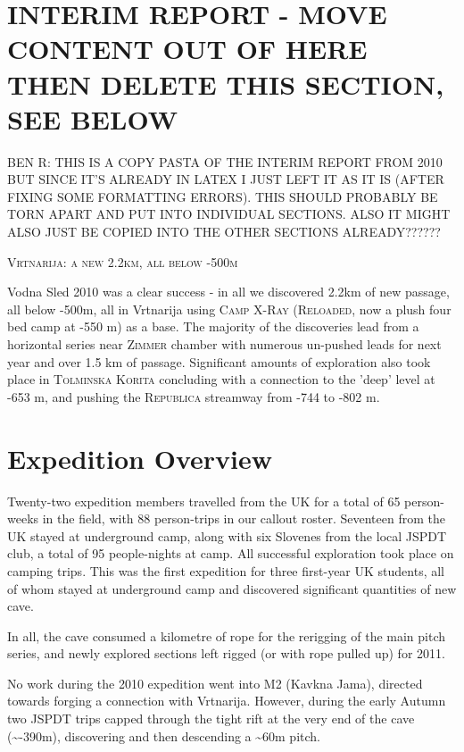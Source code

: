 \section{INTERIM REPORT - MOVE CONTENT OUT OF HERE THEN DELETE THIS SECTION, SEE BELOW}


\author{James Kirkpatrick, Jana \v{C}arga, Gergely Ambrus and Jarvist Moore
Frost}

BEN R: THIS IS A COPY PASTA OF THE INTERIM REPORT FROM 2010 BUT SINCE IT'S ALREADY IN LATEX I JUST LEFT IT AS IT IS (AFTER FIXING SOME FORMATTING ERRORS). THIS SHOULD PROBABLY BE TORN APART AND PUT INTO INDIVIDUAL SECTIONS. ALSO IT MIGHT ALSO JUST BE COPIED INTO THE OTHER SECTIONS ALREADY??????


\textsc{Vrtnarija: a new 2.2km, all below -500m}

Vodna Sled 2010 was a clear success - in all we discovered 2.2km of
new passage, all below -500m, all in Vrtnarija using \textsc{Camp
X-Ray} (\textsc{Reloaded}, now a plush four bed camp at -550 m) as a base.
The majority of the discoveries lead from a horizontal series near
\textsc{Zimmer} chamber with numerous un-pushed leads for next year
and over 1.5 km of passage. Significant amounts of exploration also
took place in \textsc{Tolminska Korita} concluding with a connection
to the 'deep' level at -653 m, and pushing the \textsc{Republica}
streamway from -744 to -802 m.

\tableofcontents

\section{Expedition Overview}

Twenty-two expedition members travelled from the UK for a total of
65 person-weeks in the field, with 88 person-trips in our callout
roster. Seventeen from the UK stayed at underground camp, along with
six Slovenes from the local JSPDT club, a total of 95 people-nights
at camp. All successful exploration took place on camping trips. 
This was the first expedition for three
first-year UK students, all of whom stayed at underground camp and
discovered significant quantities of new cave.

In all, the cave consumed a kilometre of rope for the rerigging of
the main pitch series, and newly explored sections left rigged (or
with rope pulled up) for 2011.

No work during the 2010 expedition went into M2 (Kavkna Jama), directed
towards forging a connection with Vrtnarija. However, during the early
Autumn two JSPDT trips capped through the tight rift at the very end
of the cave (\textasciitilde{}-390m), discovering and then descending
a \textasciitilde{}60m pitch.

